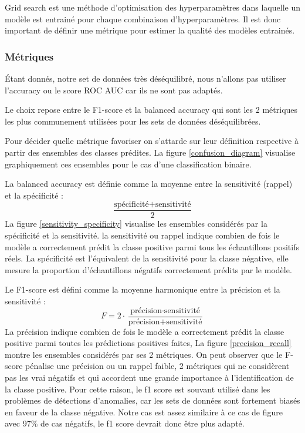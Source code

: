 Grid search est une méthode d'optimisation des hyperparamètres dans laquelle un modèle est entrainé pour chaque combinaison d'hyperparamètres.
Il est donc important de définir une métrique pour estimer la qualité des modèles entrainés.
\subsubsection{Métriques}
Étant donnés, notre set de données très déséquilibré, nous n'allons pas utiliser l'accuracy ou le score ROC AUC car ils ne sont pas adaptés.

Le choix repose entre le F1-score et la balanced accuracy qui sont les 2 métriques les plus communement utilisées pour les sets de données déséquilibrées.

Pour décider quelle métrique favoriser on s'attarde sur leur définition respective à partir des ensembles des classes prédites.
La figure \ref{confusion_diagram} visualise graphiquement ces ensembles pour le cas d'une classification binaire.

La balanced accuracy est définie comme la moyenne entre la sensitivité (rappel) et la spécificité :
$$
    \frac{\text{spécificité}+\text{sensitivité}}{2}
$$
La figure \ref{sensitivity_specificity} visualise les ensembles considérés par la spécificité et la sensitivité.
la sensitivité ou rappel indique combien de fois le modèle a correctement prédit la classe positive parmi tous les échantillons positifs réels.
La spécificité est l'équivalent de la sensitivité pour la classe négative, elle mesure la proportion d'échantillons négatifs correctement prédits par le modèle.

Le F1-score est défini comme la moyenne harmonique entre la précision et la sensitivité :
$$
    F=2\cdot\frac{\text{précision} \cdot \text{sensitivité}}{\text{précision} + \text{sensitivité}}
$$
La précision indique combien de fois le modèle a correctement prédit la classe positive parmi toutes les prédictions positives faites,
La figure \ref{precision_recall} montre les ensembles considérés par ses 2 métriques.
On peut observer que le F-score pénalise une précision ou un rappel faible, 2 métriques qui ne considèrent pas les vrai négatifs et qui accordent une grande importance à l'identification de la classe positive.
Pour cette raison, le f1 score est souvant utilisé dans les problèmes de détections d'anomalies, car les sets de données sont fortement biasés en faveur de la classe négative.
Notre cas est assez similaire à ce cas de figure avec 97\% de cas négatifs, le f1 score devrait donc être plus adapté.

